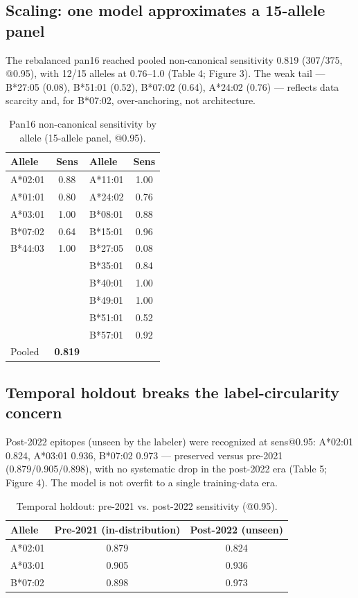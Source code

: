\documentclass[10pt]{article}
\begin{document}
\subsection{Scaling: one model approximates a 15-allele panel}
The rebalanced pan16 reached pooled non-canonical sensitivity 0.819 (307/375, @0.95), with 12/15 alleles at 0.76--1.0 (Table 4; Figure 3). The weak tail --- B*27:05 (0.08), B*51:01 (0.52), B*07:02 (0.64), A*24:02 (0.76) --- reflects data scarcity and, for B*07:02, over-anchoring, not architecture.

\begin{table}[h]
\centering
\caption{Pan16 non-canonical sensitivity by allele (15-allele panel, @0.95).}
\begin{tabular}{@{}lclc@{}}
\toprule
Allele & Sens & Allele & Sens \\
\midrule
A*02:01 & 0.88 & A*11:01 & 1.00 \\
A*01:01 & 0.80 & A*24:02 & 0.76 \\
A*03:01 & 1.00 & B*08:01 & 0.88 \\
B*07:02 & 0.64 & B*15:01 & 0.96 \\
B*44:03 & 1.00 & B*27:05 & 0.08 \\
 &  & B*35:01 & 0.84 \\
 &  & B*40:01 & 1.00 \\
 &  & B*49:01 & 1.00 \\
 &  & B*51:01 & 0.52 \\
 &  & B*57:01 & 0.92 \\
Pooled & \textbf{0.819} &  &  \\
\bottomrule
\end{tabular}
\end{table}

\subsection{Temporal holdout breaks the label-circularity concern}
Post-2022 epitopes (unseen by the labeler) were recognized at sens@0.95: A*02:01 0.824, A*03:01 0.936, B*07:02 0.973 --- preserved versus pre-2021 (0.879/0.905/0.898), with no systematic drop in the post-2022 era (Table 5; Figure 4). The model is not overfit to a single training-data era.

\begin{table}[h]
\centering
\caption{Temporal holdout: pre-2021 vs. post-2022 sensitivity (@0.95).}
\begin{tabular}{@{}lcc@{}}
\toprule
Allele & Pre-2021 (in-distribution) & Post-2022 (unseen) \\
\midrule
A*02:01 & 0.879 & 0.824 \\
A*03:01 & 0.905 & 0.936 \\
B*07:02 & 0.898 & 0.973 \\
\bottomrule
\end{tabular}
\end{table}
\end{document}

